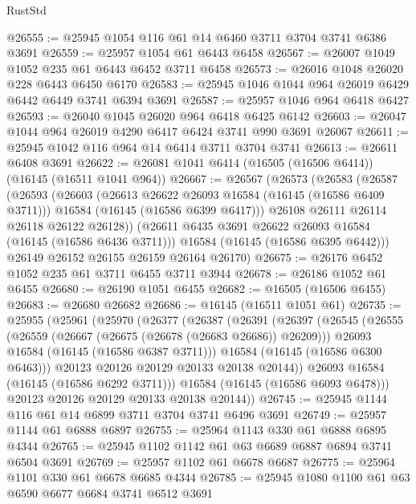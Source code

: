 \begin{lexlean}{RustStd}
\begin{coremodule}
@26555 := @25945 @1054 @116 @61 @14 @6460 @3711 @3704 @3741 @6386 @3691
@26559 := @25957 @1054 @61 @6443 @6458
@26567 := @26007 @1049 @1052 @235 @61 @6443 @6452 @3711 @6458
@26573 := @26016 @1048 @26020 @228 @6443 @6450 @6170
@26583 := @25945 @1046 @1044 @964 @26019 @6429 @6442 @6449 @3741 @6394 @3691
@26587 := @25957 @1046 @964 @6418 @6427
@26593 := @26040 @1045 @26020 @964 @6418 @6425 @6142
@26603 := @26047 @1044 @964 @26019 @4290 @6417 @6424 @3741 @990 @3691 @26067
@26611 := @25945 @1042 @116 @964 @14 @6414 @3711 @3704 @3741
@26613 := @26611 @6408 @3691
@26622 := @26081 @1041 @6414 (@16505 (@16506 @6414)) (@16145 (@16511 @1041 @964))
@26667 := @26567
    (@26573
      (@26583
        (@26587
          (@26593
            (@26603
              (@26613 @26622 @26093 @16584 (@16145 (@16586 @6409 @3711)))
              @16584
              (@16145 (@16586 @6399 @6417)))
            @26108
            @26111
            @26114
            @26118
            @26122
            @26128))
        (@26611 @6435 @3691 @26622 @26093 @16584 (@16145 (@16586 @6436 @3711)))
        @16584
        (@16145 (@16586 @6395 @6442)))
      @26149
      @26152
      @26155
      @26159
      @26164
      @26170)
@26675 := @26176 @6452 @1052 @235 @61 @3711 @6455 @3711 @3944
@26678 := @26186 @1052 @61 @6455
@26680 := @26190 @1051 @6455
@26682 := @16505 (@16506 @6455)
@26683 := @26680 @26682
@26686 := @16145 (@16511 @1051 @61)
@26735 := @25955
    (@25961
      (@25970
        (@26377
          (@26387
            (@26391
              (@26397
                (@26545
                  (@26555
                    (@26559 (@26667 (@26675 (@26678 (@26683 @26686)) @26209)))
                    @26093
                    @16584
                    (@16145 (@16586 @6387 @3711)))
                  @16584
                  (@16145 (@16586 @6300 @6463)))
                @20123
                @20126
                @20129
                @20133
                @20138
                @20144))
            @26093
            @16584
            (@16145 (@16586 @6292 @3711)))
          @16584
          (@16145 (@16586 @6093 @6478)))
        @20123
        @20126
        @20129
        @20133
        @20138
        @20144))
@26745 := @25945 @1144 @116 @61 @14 @6899 @3711 @3704 @3741 @6496 @3691
@26749 := @25957 @1144 @61 @6888 @6897
@26755 := @25964 @1143 @330 @61 @6888 @6895 @4344
@26765 := @25945 @1102 @1142 @61 @63 @6689 @6887 @6894 @3741 @6504 @3691
@26769 := @25957 @1102 @61 @6678 @6687
@26775 := @25964 @1101 @330 @61 @6678 @6685 @4344
@26785 := @25945 @1080 @1100 @61 @63 @6590 @6677 @6684 @3741 @6512 @3691

\end{coremodule}
\end{lexlean}
